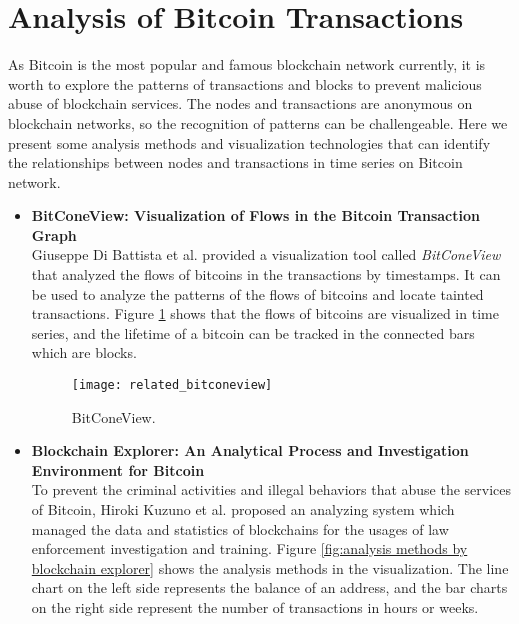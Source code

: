 \section{Analysis of Bitcoin Transactions}

As Bitcoin is the most popular and famous blockchain network currently, it is worth to explore the patterns of transactions and blocks to prevent malicious abuse of blockchain services. The nodes and transactions are anonymous on blockchain networks, so the recognition of patterns can be challengeable. Here we present some analysis methods and visualization technologies that can identify the relationships between nodes and transactions in time series on Bitcoin network.

\clearpage

\begin{itemize}
    \item \textbf{BitConeView: Visualization of Flows in the Bitcoin Transaction Graph} \cite{Battista2015} \\
        Giuseppe Di Battista et al. provided a visualization tool called \textit{BitConeView} that analyzed the flows of bitcoins in the transactions by timestamps. It can be used to analyze the patterns of the flows of bitcoins and locate tainted transactions. Figure \ref{fig:bitconeview} \cite{Battista2015} shows that the flows of bitcoins are visualized in time series, and the lifetime of a bitcoin can be tracked in the connected bars which are blocks.
        \begin{figure}[htb]
            \centering
            \texttt{[image: related\_bitconeview]}
            \caption{BitConeView.}
            \label{fig:bitconeview}
        \end{figure}
    \item \textbf{Blockchain Explorer: An Analytical Process and Investigation Environment for Bitcoin} \cite{Kuzuno2017} \\
        To prevent the criminal activities and illegal behaviors that abuse the services of Bitcoin, Hiroki Kuzuno et al. proposed an analyzing system which managed the data and statistics of blockchains for the usages of law enforcement investigation and training. 
        Figure \ref{fig:analysis methods by blockchain explorer} \cite{Kuzuno2017} shows the analysis methods in the visualization. The line chart on the left side represents the balance of an address, and the bar charts on the right side represent the number of transactions in hours or weeks.
        \begin{figure}[htb]

\end{figure}
\end{itemize}
